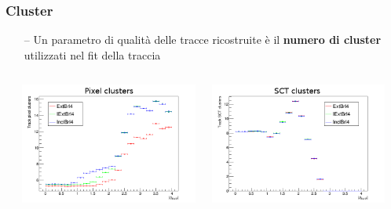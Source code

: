 \documentclass{beamer}
\begin{document}
\begin{frame}
\frametitle{Cluster}
\begin{itemize}
\item[\color{black}--] Un parametro di qualit\`a delle tracce ricostruite \`e il \textbf{numero 
di cluster} utilizzati nel fit della traccia
\end{itemize}

\begin{columns}
\begin{column}{0.09\textwidth}
\end{column}
\begin{column}{0.41\textwidth}
\includegraphics[width=\textwidth]{Tracking/nPixHits_abseta2}
\end{column}
\begin{column}{0.41\textwidth}
\includegraphics[width=\textwidth]{Tracking/nSCTHits_abseta2}
\end{column}
\begin{column}{0.09\textwidth}
\end{column}
\end{columns}
\vskip-0.1cm


\end{frame}
\end{document}
